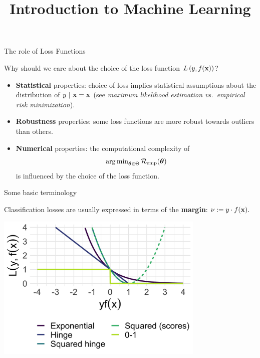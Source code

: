 \documentclass[11pt,compress,t,notes=noshow, xcolor=table]{beamer}
\title{Introduction to Machine Learning}
\institute{\href{https://compstat-lmu.github.io/lecture_i2ml/}{compstat-lmu.github.io/lecture\_i2ml}}
\date{}
\begin{document}


\begin{vbframe}{The role of Loss Functions}

Why should we care about the choice of the loss function $L\left(y, f(\mathbf{x})\right)$?

\begin{itemize}
\item \textbf{Statistical} properties: choice of loss implies statistical assumptions about the distribution of $y ~|~ \mathbf{x} = \mathbf{x}$ (see \emph{maximum likelihood estimation vs.\
empirical risk minimization}). 
\item \textbf{Robustness} properties: some loss functions are more robust towards outliers than others. 
\item \textbf{Numerical} properties: the computational complexity of
$$
\operatorname{arg\,min}_{\bm{\theta} \in \Theta} \mathcal{R}_{\text{emp}}(\bm{\theta})
$$
is influenced by the choice of the loss function. 
\end{itemize}

\end{vbframe}



\begin{vbframe}{Some basic terminology}


Classification losses are usually expressed in terms of the 
  \textbf{margin}: $\nu := y \cdot f(\mathbf{x}).$

\vfill

\begin{minipage}[b]{1\textwidth}
  \includegraphics[width=0.75\textwidth]{figure/plot_loss_overview_classif_2}
  \tiny \centering
\end{minipage}%


\end{vbframe}
\end{document}
